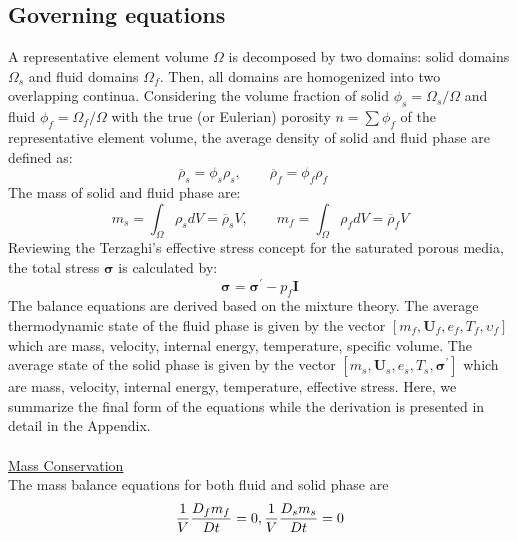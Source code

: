 \documentclass[preprint,12pt]{elsarticle}
\begin{document}
\subsection{\textsf{Governing equations}}
A representative element volume $\Omega$ is decomposed by two domains: solid domains $\Omega_s$ and fluid domains $\Omega_f$. Then, all domains are homogenized into two overlapping continua. Considering the volume fraction of solid $\phi_s = \Omega_s/\Omega$ and fluid $\phi_f = \Omega_f/\Omega$ with the true (or Eulerian) porosity $n=\sum{\phi_f}$ of the representative element volume, the average density of solid and fluid phase are defined as:\\
%
%
\begin{equation}
    \label{density} 
  \overline{\rho}_s   = \phi_s \rho_s, \qquad  \overline{\rho}_f   = \phi_f \rho_f \quad
\end{equation}
%
%
The mass of solid and fluid phase are:\\
%
%
\begin{equation}
    \label{mass} 
  m_s   = \int_{\Omega} \rho_s dV = \overline{\rho}_s V, \qquad  m_f   = \int_{\Omega} \rho_f dV = \overline{\rho}_f V
\end{equation}
%
%
Reviewing the Terzaghi's effective stress concept for the saturated porous media, the total stress $\pmb{\sigma}$ is calculated by:\\
%
%
\begin{equation}
    \label{Terzaghi} 
  \pmb{\sigma}   = \pmb{\sigma}^\prime -p_f\pmb{I}
\end{equation}
%
%
The balance equations are derived based on the mixture theory. The average thermodynamic state of the fluid phase is given by the vector $[m_f,\pmb{U}_f,e_f,T_f,\upsilon_f]$ which are mass, velocity, internal energy, temperature, specific volume. The average state of the solid phase is given by the vector $[m_s,\pmb{U}_s,e_s,T_s,\pmb{\sigma}^\prime]$ which are mass, velocity, internal energy, temperature, effective stress. Here, we summarize the final form of the equations while the derivation is presented in detail in the Appendix. 
\\
%
\underline{\hspace{5in}}\\
\underline{\textsf{Mass Conservation}}\\
The mass balance equations for both fluid and solid phase are\\
%
%
\begin{equation}
    \label{massbalance}
   \frac{1}{V}\frac{D_fm_f}{Dt} = 0, \\ 
   \frac{1}{V}\frac{D_sm_s}{Dt} = 0    
\end{equation}
\end{document}
